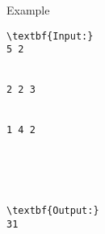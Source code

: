 Example
\begin{verbatim}
\textbf{Input:}
5 2


2 2 3


1 4 2





\textbf{Output:}
31
\end{verbatim}